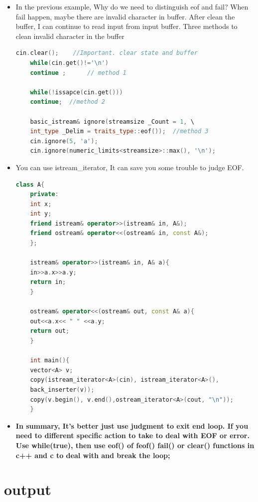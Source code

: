 \documentclass[a4paper,11pt,twoside]{book}
\begin{document}
\begin{itemize}
	\item In the previous example, Why do we need to distinguish eof and fail? When fail happen, maybe there are invalid character in buffer. After clean the buffer, I can continue to read input from input buffer. Three methods to clean invalid character in the buffer
	\begin{lstlisting}[frame=single, language=c++]
	cin.clear();    //Important. clear state and buffer
	while(cin.get()!='\n')
	continue ;      // method 1
	
	while(!issapce(cin.get()))
	continue;  //method 2
	
	basic_istream& ignore(streamsize _Count = 1, \
	int_type _Delim = traits_type::eof());  //method 3
	cin.ignore(5, 'a');
	cin.ignore(numeric_limits<streamsize>::max(), '\n');
	\end{lstlisting}
	
	\item You can use istream\_iterator, It can save you some trouble to judge EOF.
	
	\begin{lstlisting}[frame=single, language=c++]
	class A{
	private:
	int x;
	int y;
	friend istream& operator>>(istream& in, A&);
	friend ostream& operator<<(ostream& in, const A&);
	};
	
	istream& operator>>(istream& in, A& a){
	in>>a.x>>a.y;
	return in;
	}
	
	ostream& operator<<(ostream& out, const A& a){
	out<<a.x<< " " <<a.y;
	return out;
	}
	
	int main(){
	vector<A> v;
	copy(istream_iterator<A>(cin), istream_iterator<A>(),
	back_inserter(v));
	copy(v.begin(), v.end(),ostream_iterator<A>(cout, "\n"));
	}
	\end{lstlisting}
	
	
	\item \textbf{In summary, It's better just use judgment to exit end loop.  If you need to different specific action to take to deal with EOF or error. Use while(true), then use eof() of feof() fail() or clear() functions in c++ and c to deal with and break the loop; }
\end{itemize}

\section{output}
\end{document}
